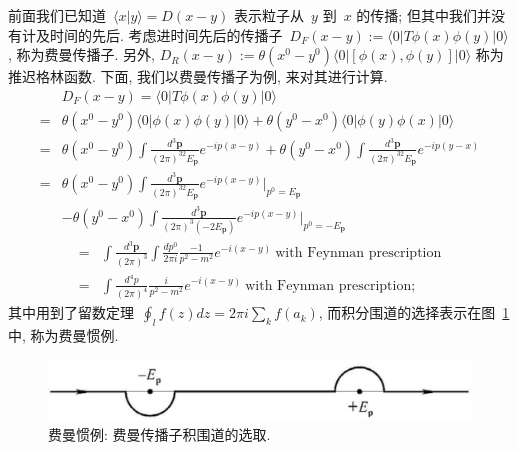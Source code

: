 前面我们已知道~$\langle x|y\rangle=D(x-y)$ 表示粒子从~$y$ 到~$x$ 的传播; 但其中我们并没有计及时间的先后. 考虑进时间先后的传播子~$D_F(x-y):=\langle0|T\phi(x)\phi(y)|0\rangle$, 称为费曼传播子. 另外, $D_R(x-y):=\theta(x^0-y^0)\langle0|[\phi(x),\phi(y)]|0\rangle$ 称为推迟格林函数. 下面, 我们以费曼传播子为例, 来对其进行计算.
\begin{align}
&D_F(x-y)=\langle0|T\phi(x)\phi(y)|0\rangle\nonumber\\
=&\theta(x^0-y^0)\langle0|\phi(x)\phi(y)|0\rangle+\theta(y^0-x^0)\langle0|\phi(y)\phi(x)|0\rangle\nonumber\\
=&\theta(x^0-y^0)\int\frac{d^3\bm{p}}{(2\pi)^32E_{\bm{p}}}e^{-ip(x-y)}+\theta(y^0-x^0)\int\frac{d^3\bm{p}}{(2\pi)^32E_{\bm{p}}}e^{-ip(y-x)}\nonumber\\
=&\theta(x^0-y^0)\int\frac{d^3\bm{p}}{(2\pi)^32E_{\bm{p}}}e^{-ip(x-y)}\Big|_{p^0=E_{\bm{p}}}\nonumber\\
&-\theta(y^0-x^0)\int\frac{d^3\bm{p}}{(2\pi)^3(-2E_{\bm{p}})}e^{-ip(x-y)}\Big|_{p^0=-E_{\bm{p}}}\nonumber
\end{align}
\begin{align}
=&\int\frac{d^3\bm{p}}{(2\pi)^3}\int\frac{dp^0}{2\pi i}\frac{-1}{p^2-m^2}e^{-i(x-y)}~\textrm{with~Feynman~prescription}\nonumber\\
=&\int\frac{d^4p}{(2\pi)^4}\frac{i}{p^2-m^2}e^{-i(x-y)}~\textrm{with~Feynman~prescription};
\end{align}
其中用到了留数定理~$\oint_l f(z)dz=2\pi i\sum_k f(a_k)$, 而积分围道的选择表示在图~\ref{feynman} 中, 称为费曼惯例.
\begin{figure}[!h]
\begin{center}
\includegraphics[width=7 cm]{pic/feynman.jpg}
\caption{费曼惯例: 费曼传播子积围道的选取.}
\label{feynman}
\end{center}
\end{figure}

